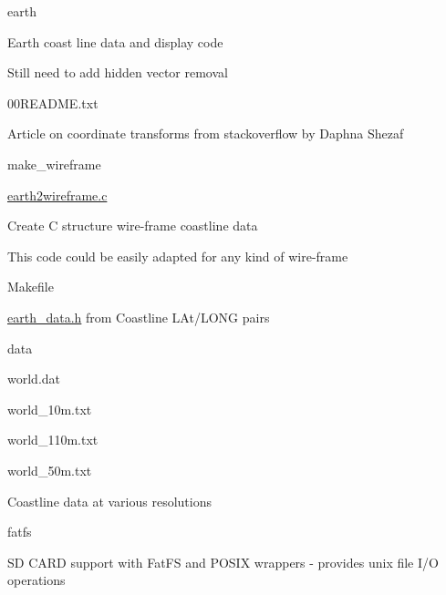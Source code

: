 \begin{DoxyItemize}
\item earth
\begin{DoxyItemize}
\item Earth coast line data and display code
\item Still need to add hidden vector removal
\begin{DoxyItemize}
\item 00\+R\+E\+A\+D\+M\+E.\+txt
\begin{DoxyItemize}
\item Article on coordinate transforms from stackoverflow by Daphna Shezaf
\end{DoxyItemize}
\item make\+\_\+wireframe
\begin{DoxyItemize}
\item \hyperlink{earth2wireframe_8c}{earth2wireframe.\+c}
\begin{DoxyItemize}
\item Create C structure wire-\/frame coastline data
\item This code could be easily adapted for any kind of wire-\/frame
\end{DoxyItemize}
\item Makefile
\begin{DoxyItemize}
\item \hyperlink{earth__data_8h}{earth\+\_\+data.\+h} from Coastline L\+At/\+L\+O\+NG pairs
\end{DoxyItemize}
\item data
\begin{DoxyItemize}
\item world.\+dat
\item world\+\_\+10m.\+txt
\item world\+\_\+110m.\+txt
\item world\+\_\+50m.\+txt
\begin{DoxyItemize}
\item Coastline data at various resolutions
\end{DoxyItemize}
\end{DoxyItemize}
\end{DoxyItemize}
\end{DoxyItemize}
\end{DoxyItemize}
\item fatfs
\begin{DoxyItemize}
\item SD C\+A\+RD support with Fat\+FS and P\+O\+S\+IX wrappers -\/ provides unix file I/O operations

\end{DoxyItemize}
\end{DoxyItemize}
